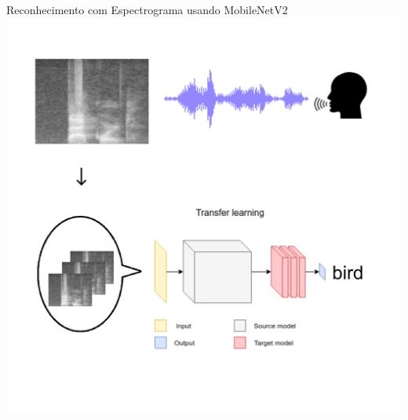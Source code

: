 \documentclass[10pt, compress]{beamer}
\begin{document}
\begin{frame}{Reconhecimento com Espectrograma usando MobileNetV2}
\centering
\includegraphics[scale=0.2]{images/process.png}
\end{frame}
\end{document}
